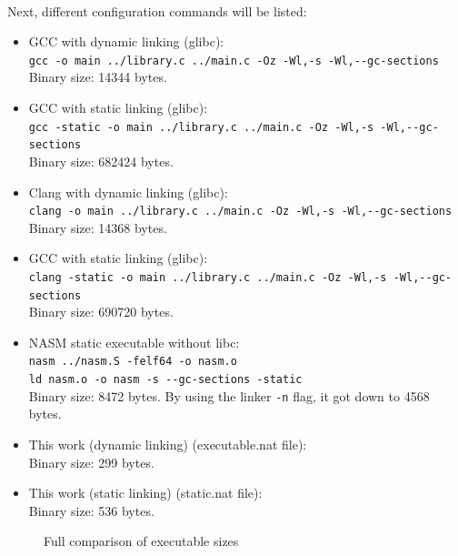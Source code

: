 \documentclass[12pt]{article}
\begin{document}
	\paragraph{}Next, different configuration commands will be listed:
	\begin{itemize}
		\item \acrshort{GCC} with dynamic linking (\gls{glibc}):\\
		\verb|gcc -o main ../library.c ../main.c -Oz -Wl,-s -Wl,--gc-sections|\\
		Binary size: 14344 bytes.
		\item \acrshort{GCC} with static linking (\gls{glibc}):\\
		\verb|gcc -static -o main ../library.c ../main.c -Oz -Wl,-s -Wl,--gc-sections|\\
		Binary size: 682424 bytes.
		\item Clang with dynamic linking (\gls{glibc}):\\
		\verb|clang -o main ../library.c ../main.c -Oz -Wl,-s -Wl,--gc-sections|\\
		Binary size: 14368 bytes.
		\item \acrshort{GCC} with static linking (\gls{glibc}):\\
		\verb|clang -static -o main ../library.c ../main.c -Oz -Wl,-s -Wl,--gc-sections|\\
		Binary size: 690720 bytes.
		\item \acrshort{NASM} static executable without libc:\\
		\verb|nasm ../nasm.S -felf64 -o nasm.o|\\
		\verb|ld nasm.o -o nasm -s --gc-sections -static|\\
		Binary size: 8472 bytes. By using the linker \verb|-n| flag, it got down to 4568 bytes.
		\item This work (dynamic linking) (executable.nat file):\\
		Binary size: 299 bytes.
		\item This work (static linking) (static.nat file):\\
		Binary size: 536 bytes.
	\end{itemize}
	
		\begin{figure}
		\caption{Full comparison of executable sizes}
		\label{fig:full-comparison}
	\end{figure}
	
\end{document}
